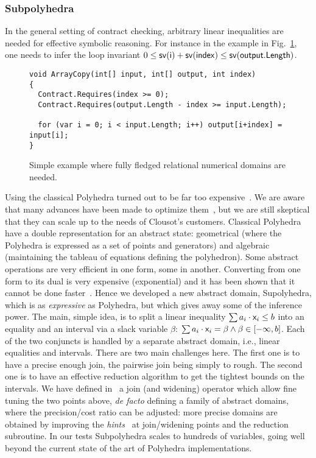 \documentclass{llncs}
\begin{document}
\subsubsection{Subpolyhedra}
In the general setting of contract checking, arbitrary linear inequalities are needed for  effective symbolic reasoning.
For instance in the example in Fig.~\ref{fig:arraycopy}, one needs to infer the loop invariant $0 \leq \mathsf{sv(i)} + \mathsf{sv(index)} \leq \mathsf{sv(output.Length)}$.

\begin{figure}[t]
\begin{lstlisting}
void ArrayCopy(int[] input, int[] output, int index)
{
  Contract.Requires(index >= 0);
  Contract.Requires(output.Length - index >= input.Length);

  for (var i = 0; i < input.Length; i++) output[i+index] = input[i];
}
\end{lstlisting}
\caption{Simple example where fully fledged relational numerical domains are needed.}
\label{fig:arraycopy}
\end{figure}

Using the classical Polyhedra turned out to be far too
expensive~\cite{FerraraLogozzoFahndrich-OOPSLA08}.  We are aware that
many advances have been made to optimize them~\cite{ppl,apron}, but we
are still skeptical that they can scale up to the needs of Clousot's
customers.  Classical Polyhedra have a double representation for an
abstract state: geometrical (where the Polyhedra is expressed as a set
of points and generators) and algebraic (maintaining the tableau of
equations defining the polyhedron).  Some abstract operations are very
efficient in one form, some in another.  Converting from one form to
its dual is very expensive (exponential) and it has been shown that it
cannot be done faster~\cite{KhachiyanBBEG08}.  Hence we
developed a new abstract domain, Supolyhedra, which is as
\emph{expressive} as Polyhedra, but which gives away some of the
inference power.  The main, simple idea, is to split a linear
inequality $\sum a_i \cdot \mathsf{x}_i \leq b$ into an equality and an
interval via a slack variable $\beta$: $\sum a_i \cdot \mathsf{x}_i =
\beta \wedge \beta \in[-\infty, b]$.  Each of the two conjuncts is
handled by a separate abstract domain, i.e., linear equalities and intervals.  There are two main
challenges here.  The first one is to have a precise enough join, the
pairwise join being simply to rough.  The second one is to have an
effective reduction algorithm to get the tightest bounds on the
intervals.  We have defined in~\cite{LavironLogozzo09-1} a join (and
widening) operator which allow fine tuning the two points above,
\emph{de facto} defining a family of abstract domains, where the
precision/cost ratio can be adjusted: more precise domains are
obtained by improving the \emph{hints}~\cite{LavironLogozzo9} at
join/widening points and the reduction subroutine.  In our tests
Subpolyhedra scales to hundreds of variables, going well beyond the
current state of the art of Polyhedra implementations.
\end{document}
